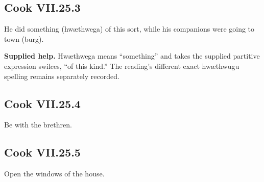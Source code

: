 \par\begin{minipage}{\linewidth}\raggedright
\subsection*{Cook VII.25.3}

He did something (hwæthwega) of this sort, while his companions were going to town (burg).

\end{minipage}\par\addvspace{4pt}

\textbf{Supplied help.} Hwæthwega means “something” and takes the supplied partitive expression swilces, “of this kind.” The reading’s different exact hwæthwugu spelling remains separately recorded.

\par\begin{minipage}{\linewidth}\raggedright
\subsection*{Cook VII.25.4}

Be with the brethren.

\end{minipage}\par\addvspace{4pt}

\par\begin{minipage}{\linewidth}\raggedright
\subsection*{Cook VII.25.5}

Open the windows of the house.

\end{minipage}\par\addvspace{4pt}

